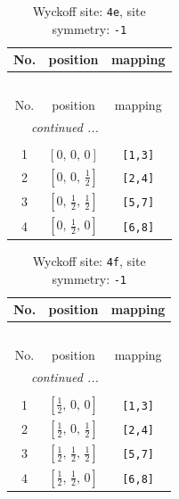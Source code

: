 \documentclass[fleqn,8pt]{jsarticle}
\begin{document}
\begin{longtable}{ccc}
\caption{Wyckoff site: {\tt 4e}, site symmetry: {\tt -1}}
 \\
 \hline \hline
No. & position & mapping \\ \hline \endfirsthead

\multicolumn{2}{l}{\tablename\ \thetable{}} \\
 \hline \hline
No. & position & mapping \\ \hline \endhead

 \hline \hline
\multicolumn{2}{r}{\footnotesize\it continued ...} \\ \endfoot

 \hline \hline
\multicolumn{2}{r}{} \\ \endlastfoot

1 & $\left[ 0,\, 0,\, 0 \right]$ & {\tt [1,3]} \\ \hline
2 & $\left[ 0,\, 0,\, \frac{1}{2} \right]$ & {\tt [2,4]} \\ \hline
3 & $\left[ 0,\, \frac{1}{2},\, \frac{1}{2} \right]$ & {\tt [5,7]} \\ \hline
4 & $\left[ 0,\, \frac{1}{2},\, 0 \right]$ & {\tt [6,8]} \\
\end{longtable}
\renewcommand{\arraystretch}{1.2}
\begin{longtable}{ccc}
\caption{Wyckoff site: {\tt 4f}, site symmetry: {\tt -1}}
 \\
 \hline \hline
No. & position & mapping \\ \hline \endfirsthead

\multicolumn{2}{l}{\tablename\ \thetable{}} \\
 \hline \hline
No. & position & mapping \\ \hline \endhead

 \hline \hline
\multicolumn{2}{r}{\footnotesize\it continued ...} \\ \endfoot

 \hline \hline
\multicolumn{2}{r}{} \\ \endlastfoot

1 & $\left[ \frac{1}{2},\, 0,\, 0 \right]$ & {\tt [1,3]} \\ \hline
2 & $\left[ \frac{1}{2},\, 0,\, \frac{1}{2} \right]$ & {\tt [2,4]} \\ \hline
3 & $\left[ \frac{1}{2},\, \frac{1}{2},\, \frac{1}{2} \right]$ & {\tt [5,7]} \\ \hline
4 & $\left[ \frac{1}{2},\, \frac{1}{2},\, 0 \right]$ & {\tt [6,8]} \\
\end{longtable}
\end{document}
